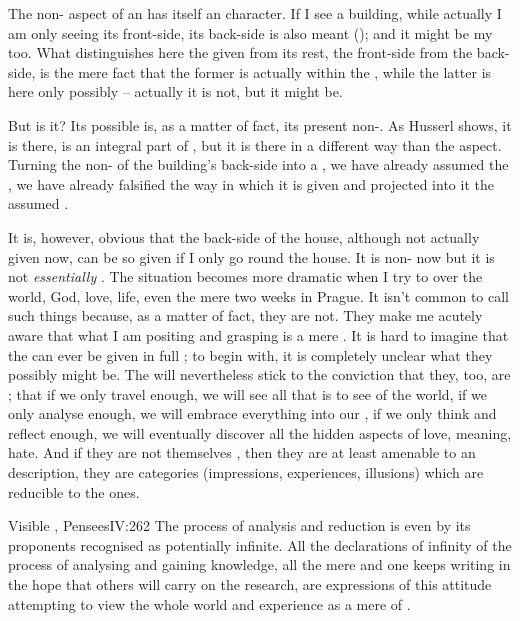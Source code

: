 \pa
The non- aspect of an  has itself an 
 character. If I see a building, while actually I am only 
seeing its front-side, its back-side is also meant (); and it might be my 
 too. What distinguishes here the given  from its rest, the 
front-side from the back-side, is the mere fact that the former is 
actually within the \hoa, while the latter is here only possibly -- 
actually it is not, but it might be. 

But is it? Its possible  is, as a matter of fact, its 
present non-. As Husserl shows, it is there, is an 
integral part of , but it is there in a different 
way than the  aspect. Turning the non- of 
the building's back-side into a , we have already 
assumed the , we have already falsified 
the way in which it is given and projected into it the assumed 
. 

It is, however, obvious that the back-side of the house, although not actually
given now, can be so given if I only go round the house. It is non-
now but it is not {\em essentially} . 
The situation becomes more dramatic when I try to  over the world,
God, love, life, even the mere two weeks in Prague. It isn't common to call such
things  because, as 
a matter of fact, they are not. They make me acutely aware that what I am
positing and grasping is a mere . It is hard to imagine that the
 can ever be given in full ; to begin with, it
is completely unclear what they possibly might be. The  will nevertheless stick to the conviction that they, too, are
; that if we only travel enough, we will see all that is to see of
the world, if we only analyse enough, we will embrace everything into our
, if we only think and reflect enough, we will eventually
discover all the hidden aspects of love, meaning, hate. And if they are not
themselves , then they are at least amenable to an 
description, they are  categories (impressions, experiences, illusions)
which are reducible to the  ones. 


Visible , \citet{reasons, seen from afar, appear to limit our view;
  but when they are reached, we begin to see beyond.}{Pensees}{IV:262} The
process of analysis and reduction is even by its proponents recognised as
potentially infinite.  All the declarations of infinity of the process of
analysing and gaining knowledge, all the mere  and
 one keeps writing in the hope that others will carry on the
  research, 
are expressions of this attitude attempting to view the whole world and
experience as a mere  of . 

